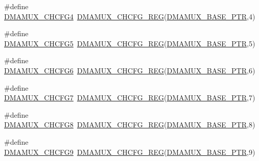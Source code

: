 \begin{DoxyCompactItemize}
\item 
\#define \hyperlink{group___d_m_a_m_u_x___register___accessor___macros_ga53ff670480726d3532078167c90eacb9}{D\+M\+A\+M\+U\+X\+\_\+\+C\+H\+C\+F\+G4}~\hyperlink{group___d_m_a_m_u_x___register___accessor___macros_ga10cf09fe06ed04dc004b7b41da7cbf0d}{D\+M\+A\+M\+U\+X\+\_\+\+C\+H\+C\+F\+G\+\_\+\+R\+EG}(\hyperlink{group___d_m_a_m_u_x___peripheral_gad38c261e5de04658dbad762d40e8904e}{D\+M\+A\+M\+U\+X\+\_\+\+B\+A\+S\+E\+\_\+\+P\+TR},4)
\item 
\#define \hyperlink{group___d_m_a_m_u_x___register___accessor___macros_ga22d9e009fc1f5358e9c705e3a645c5fb}{D\+M\+A\+M\+U\+X\+\_\+\+C\+H\+C\+F\+G5}~\hyperlink{group___d_m_a_m_u_x___register___accessor___macros_ga10cf09fe06ed04dc004b7b41da7cbf0d}{D\+M\+A\+M\+U\+X\+\_\+\+C\+H\+C\+F\+G\+\_\+\+R\+EG}(\hyperlink{group___d_m_a_m_u_x___peripheral_gad38c261e5de04658dbad762d40e8904e}{D\+M\+A\+M\+U\+X\+\_\+\+B\+A\+S\+E\+\_\+\+P\+TR},5)
\item 
\#define \hyperlink{group___d_m_a_m_u_x___register___accessor___macros_gad0e1b84f409957938aa005484ec9f454}{D\+M\+A\+M\+U\+X\+\_\+\+C\+H\+C\+F\+G6}~\hyperlink{group___d_m_a_m_u_x___register___accessor___macros_ga10cf09fe06ed04dc004b7b41da7cbf0d}{D\+M\+A\+M\+U\+X\+\_\+\+C\+H\+C\+F\+G\+\_\+\+R\+EG}(\hyperlink{group___d_m_a_m_u_x___peripheral_gad38c261e5de04658dbad762d40e8904e}{D\+M\+A\+M\+U\+X\+\_\+\+B\+A\+S\+E\+\_\+\+P\+TR},6)
\item 
\#define \hyperlink{group___d_m_a_m_u_x___register___accessor___macros_gaca9b7f4e8c1eff908f602d0f03dbdced}{D\+M\+A\+M\+U\+X\+\_\+\+C\+H\+C\+F\+G7}~\hyperlink{group___d_m_a_m_u_x___register___accessor___macros_ga10cf09fe06ed04dc004b7b41da7cbf0d}{D\+M\+A\+M\+U\+X\+\_\+\+C\+H\+C\+F\+G\+\_\+\+R\+EG}(\hyperlink{group___d_m_a_m_u_x___peripheral_gad38c261e5de04658dbad762d40e8904e}{D\+M\+A\+M\+U\+X\+\_\+\+B\+A\+S\+E\+\_\+\+P\+TR},7)
\item 
\#define \hyperlink{group___d_m_a_m_u_x___register___accessor___macros_ga6175e989543915c1f2fe0d3e1b03b7d7}{D\+M\+A\+M\+U\+X\+\_\+\+C\+H\+C\+F\+G8}~\hyperlink{group___d_m_a_m_u_x___register___accessor___macros_ga10cf09fe06ed04dc004b7b41da7cbf0d}{D\+M\+A\+M\+U\+X\+\_\+\+C\+H\+C\+F\+G\+\_\+\+R\+EG}(\hyperlink{group___d_m_a_m_u_x___peripheral_gad38c261e5de04658dbad762d40e8904e}{D\+M\+A\+M\+U\+X\+\_\+\+B\+A\+S\+E\+\_\+\+P\+TR},8)
\item 
\#define \hyperlink{group___d_m_a_m_u_x___register___accessor___macros_ga9f40b539d1a70d5c0608bf8032032ba9}{D\+M\+A\+M\+U\+X\+\_\+\+C\+H\+C\+F\+G9}~\hyperlink{group___d_m_a_m_u_x___register___accessor___macros_ga10cf09fe06ed04dc004b7b41da7cbf0d}{D\+M\+A\+M\+U\+X\+\_\+\+C\+H\+C\+F\+G\+\_\+\+R\+EG}(\hyperlink{group___d_m_a_m_u_x___peripheral_gad38c261e5de04658dbad762d40e8904e}{D\+M\+A\+M\+U\+X\+\_\+\+B\+A\+S\+E\+\_\+\+P\+TR},9)

\end{DoxyCompactItemize}
